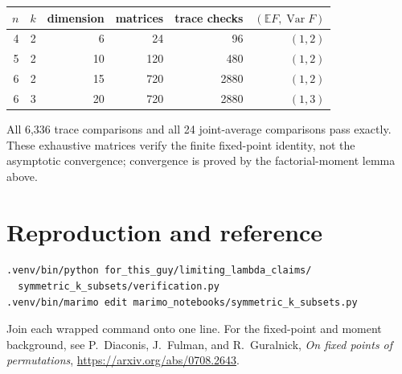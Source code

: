 \documentclass[11pt]{article}
\begin{document}
\begin{center}
\begin{tabular}{@{}rrrrrr@{}}\toprule
$n$&$k$&dimension&matrices&trace checks&$(\mathbb E F,\operatorname{Var}F)$\\\midrule
4&2&6&24&96&$(1,2)$\\
5&2&10&120&480&$(1,2)$\\
6&2&15&720&2880&$(1,2)$\\
6&3&20&720&2880&$(1,3)$\\\bottomrule
\end{tabular}
\end{center}
All 6,336 trace comparisons and all 24 joint-average comparisons pass exactly.
These exhaustive matrices verify the finite fixed-point identity, not the
asymptotic convergence; convergence is proved by the factorial-moment lemma
above.

\section{Reproduction and reference}
\begin{verbatim}
.venv/bin/python for_this_guy/limiting_lambda_claims/
  symmetric_k_subsets/verification.py
.venv/bin/marimo edit marimo_notebooks/symmetric_k_subsets.py
\end{verbatim}
Join each wrapped command onto one line.  For the fixed-point and moment
background, see P.~Diaconis, J.~Fulman, and R.~Guralnick,
\emph{On fixed points of permutations},
\url{https://arxiv.org/abs/0708.2643}.
\end{document}
